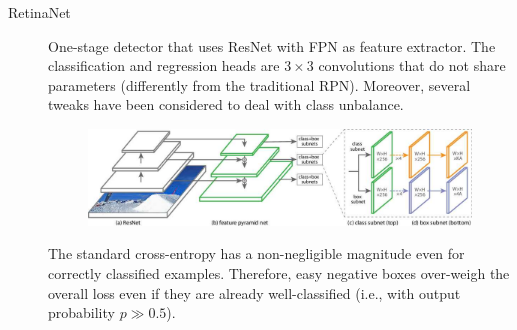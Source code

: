 \begin{description}
    \item[RetinaNet] 
        One-stage detector that uses ResNet with FPN as feature extractor. The classification and regression heads are $3 \times 3$ convolutions that do not share parameters (differently from the traditional RPN). Moreover, several tweaks have been considered to deal with class unbalance.

        \begin{figure}[H]
            \centering
            \includegraphics[width=0.8\linewidth]{./img/_retinanet.jpg}
        \end{figure}

        \begin{remark}
            The standard cross-entropy has a non-negligible magnitude even for correctly classified examples. Therefore, easy negative boxes over-weigh the overall loss even if they are already well-classified (i.e., with output probability $p \gg 0.5$).
        \end{remark}


\end{description}
